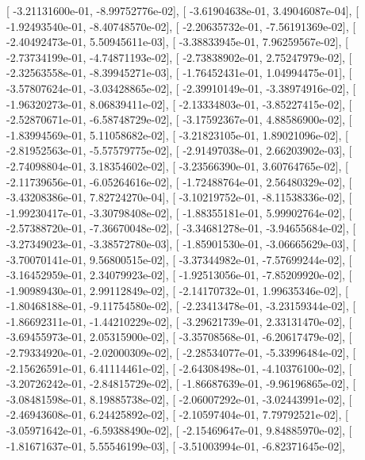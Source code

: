 \documentclass{article}
\begin{document}
       [ -3.21131600e-01,  -8.99752776e-02],
       [ -3.61904638e-01,   3.49046087e-04],
       [ -1.92493540e-01,  -8.40748570e-02],
       [ -2.20635732e-01,  -7.56191369e-02],
       [ -2.40492473e-01,   5.50945611e-03],
       [ -3.38833945e-01,   7.96259567e-02],
       [ -2.73734199e-01,  -4.74871193e-02],
       [ -2.73838902e-01,   2.75247979e-02],
       [ -2.32563558e-01,  -8.39945271e-03],
       [ -1.76452431e-01,   1.04994475e-01],
       [ -3.57807624e-01,  -3.03428865e-02],
       [ -2.39910149e-01,  -3.38974916e-02],
       [ -1.96320273e-01,   8.06839411e-02],
       [ -2.13334803e-01,  -3.85227415e-02],
       [ -2.52870671e-01,  -6.58748729e-02],
       [ -3.17592367e-01,   4.88586900e-02],
       [ -1.83994569e-01,   5.11058682e-02],
       [ -3.21823105e-01,   1.89021096e-02],
       [ -2.81952563e-01,  -5.57579775e-02],
       [ -2.91497038e-01,   2.66203902e-03],
       [ -2.74098804e-01,   3.18354602e-02],
       [ -3.23566390e-01,   3.60764765e-02],
       [ -2.11739656e-01,  -6.05264616e-02],
       [ -1.72488764e-01,   2.56480329e-02],
       [ -3.43208386e-01,   7.82724270e-04],
       [ -3.10219752e-01,  -8.11538336e-02],
       [ -1.99230417e-01,  -3.30798408e-02],
       [ -1.88355181e-01,   5.99902764e-02],
       [ -2.57388720e-01,  -7.36670048e-02],
       [ -3.34681278e-01,  -3.94655684e-02],
       [ -3.27349023e-01,  -3.38572780e-03],
       [ -1.85901530e-01,  -3.06665629e-03],
       [ -3.70070141e-01,   9.56800515e-02],
       [ -3.37344982e-01,  -7.57699244e-02],
       [ -3.16452959e-01,   2.34079923e-02],
       [ -1.92513056e-01,  -7.85209920e-02],
       [ -1.90989430e-01,   2.99112849e-02],
       [ -2.14170732e-01,   1.99635346e-02],
       [ -1.80468188e-01,  -9.11754580e-02],
       [ -2.23413478e-01,  -3.23159344e-02],
       [ -1.86692311e-01,  -1.44210229e-02],
       [ -3.29621739e-01,   2.33131470e-02],
       [ -3.69455973e-01,   2.05315900e-02],
       [ -3.35708568e-01,  -6.20617479e-02],
       [ -2.79334920e-01,  -2.02000309e-02],
       [ -2.28534077e-01,  -5.33996484e-02],
       [ -2.15626591e-01,   6.41114461e-02],
       [ -2.64308498e-01,  -4.10376100e-02],
       [ -3.20726242e-01,  -2.84815729e-02],
       [ -1.86687639e-01,  -9.96196865e-02],
       [ -3.08481598e-01,   8.19885738e-02],
       [ -2.06007292e-01,  -3.02443991e-02],
       [ -2.46943608e-01,   6.24425892e-02],
       [ -2.10597404e-01,   7.79792521e-02],
       [ -3.05971642e-01,  -6.59388490e-02],
       [ -2.15469647e-01,   9.84885970e-02],
       [ -1.81671637e-01,   5.55546199e-03],
       [ -3.51003994e-01,  -6.82371645e-02],
\end{document}
